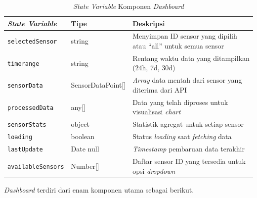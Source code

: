 \begin{table}[H]
  \caption{\textit{State Variable} Komponen \textit{Dashboard}}
  \label{tab:state-variable}
  \begin{tabularx}{\textwidth}{| l | l | X |}
    \hline
    \textbf{\textit{State Variable}} & \textbf{Tipe} & \textbf{Deskripsi} \\
    \hline
    \texttt{selectedSensor} & string & Menyimpan ID sensor yang dipilih atau ``all'' untuk semua sensor \\
    \hline
    \texttt{timerange} & string & Rentang waktu data yang ditampilkan (24h, 7d, 30d) \\
    \hline
    \texttt{sensorData} & SensorDataPoint[] & \textit{Array} data mentah dari sensor yang diterima dari API \\
    \hline
    \texttt{processedData} & any[] & Data yang telah diproses untuk visualisasi \textit{chart} \\
    \hline
    \texttt{sensorStats} & object & Statistik agregat untuk setiap sensor \\
    \hline
    \texttt{loading} & boolean & Status \textit{loading} saat \textit{fetching} data \\
    \hline
    \texttt{lastUpdate} & Date \textbar{} null & \textit{Timestamp} pembaruan data terakhir \\
    \hline
    \texttt{availableSensors} & Number[] & Daftar sensor ID yang tersedia untuk opsi \textit{dropdown} \\
    \hline
  \end{tabularx}
\end{table}

\textit{Dashboard} terdiri dari enam komponen utama sebagai berikut.

